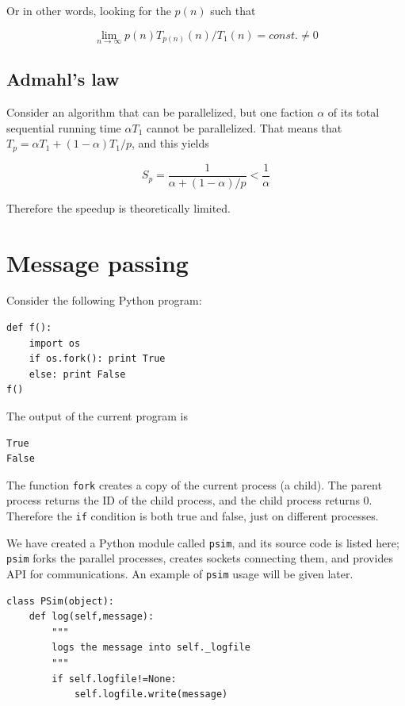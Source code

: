 \documentclass[justified,sixbynine]{tufte-book}
\def\ft{\small\tt}
\theoremstyle{plain}%
\theoremstyle{definition}
\theoremstyle{remark}
\begin{document}
\begin{fullwidth}
Or in other words, looking for the $p(n)$ such that

\begin{equation}
\lim_{n\rightarrow\infty} p(n) T_{p(n)}(n) / T_1(n) = const. \ne 0
\end{equation}

\goodbreak\subsection{Admahl's law}

Consider an algorithm that can be parallelized, but one faction $\alpha$ of its total sequential running time $\alpha T_1$ cannot be parallelized. That means that $T_p = \alpha T_1 + (1-\alpha) T_1/p$, and this yields~\cite{admhal}

\begin{equation}
S_p = \frac{1}{\alpha+(1-\alpha)/p} < \frac{1}{\alpha}
\end{equation}

Therefore the speedup is theoretically limited.

\goodbreak\section{Message passing}

Consider the following Python program:
\begin{lstlisting}
def f():
    import os
    if os.fork(): print True
    else: print False
f()
\end{lstlisting}
The output of the current program is
\begin{lstlisting}
True
False
\end{lstlisting}

The function {\ft fork} creates a copy of the current process (a child). The parent process returns the ID of the child process, and the child process returns 0. Therefore the {\ft if} condition is both true and false, just on different processes.

We have created a Python module called {\ft psim}, and its source code is listed here; {\ft psim} forks the parallel processes, creates sockets connecting them, and provides API for communications. An example of {\ft psim} usage will be given later.


\begin{lstlisting}[caption={in file: {\ft psim.py}}]
class PSim(object):
    def log(self,message):
        """
        logs the message into self._logfile
        """
        if self.logfile!=None:
            self.logfile.write(message)


\end{lstlisting}
\end{fullwidth}
\end{document}
